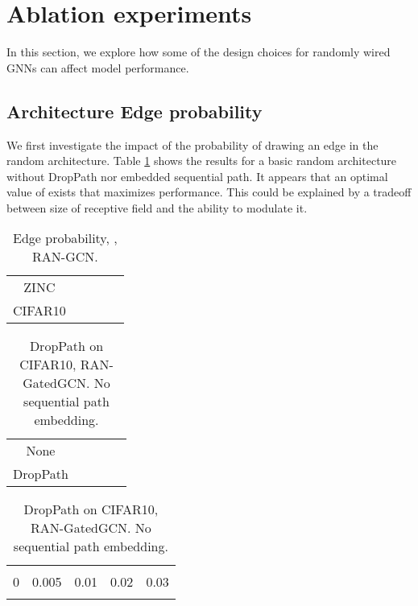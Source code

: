 \documentclass[10pt,twocolumn,twoside]{IEEEtran}
\begin{document}
\section{Ablation experiments}

In this section, we explore how some of the design choices for randomly wired GNNs can affect model performance.

\subsection{Architecture Edge probability}

We first investigate the impact of the probability  of drawing an edge in the random architecture. Table \ref{table:p_ablation} shows the results for a basic random architecture without DropPath nor embedded sequential path. It appears that an optimal value of  exists that maximizes performance. This could be explained by a tradeoff between size of receptive field and the ability to modulate it.

\begin{table}[t]
    \centering
    \caption{Edge probability, , RAN-GCN.}
    \renewcommand{\arraystretch}{1.5}
    \begin{tabular}{ccccc}
         &  &  &  &  \\ \hline
        ZINC &  &  &  &  \\
        CIFAR10 &  &  &  &  \\ \hline
    \end{tabular}
    \label{table:p_ablation}
    \vspace{-1pt}
\end{table}

\begin{table}[t]
    \centering
    \caption{DropPath on CIFAR10, RAN-GatedGCN. No sequential path embedding.} \label{table:droppath_ablation}
\setlength\tabcolsep{2pt} 
\renewcommand{\arraystretch}{1.5}
\centering
\begin{tabular}{ccccc}
         &  &  &  \\ \hline
        None &  &  & \\
        DropPath & &  &  \\ \hline
    \end{tabular}
\end{table}
    
\begin{table}[]
    \centering
    \caption{DropPath on CIFAR10, RAN-GatedGCN. No sequential path embedding.} \label{table:pdrop_ablation}
\setlength\tabcolsep{2pt} 
\renewcommand{\arraystretch}{1.5}
\begin{tabular}{ccccc}
          \multicolumn{5}{c}{}                                                                             \\
          0                  & 0.005              & 0.01                        & 0.02               & 0.03               \\ \hline
  &  &  &  &  \\ \hline
\end{tabular}

\end{table}
\end{document}
